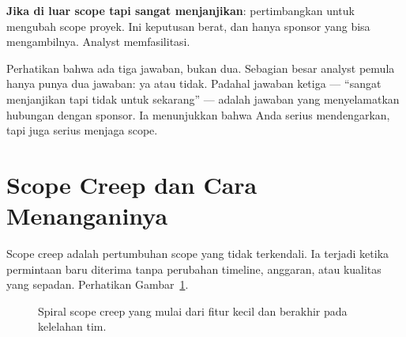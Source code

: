 \documentclass[11pt,a4paper]{article}
\begin{document}
\textbf{Jika di luar scope tapi sangat menjanjikan}: pertimbangkan untuk mengubah scope proyek. Ini keputusan berat, dan hanya sponsor yang bisa mengambilnya. Analyst memfasilitasi.

Perhatikan bahwa ada tiga jawaban, bukan dua. Sebagian besar analyst pemula hanya punya dua jawaban: ya atau tidak. Padahal jawaban ketiga — ``sangat menjanjikan tapi tidak untuk sekarang'' — adalah jawaban yang menyelamatkan hubungan dengan sponsor. Ia menunjukkan bahwa Anda serius mendengarkan, tapi juga serius menjaga scope.

\section{Scope Creep dan Cara Menanganinya}

Scope creep adalah pertumbuhan scope yang tidak terkendali. Ia terjadi ketika permintaan baru diterima tanpa perubahan timeline, anggaran, atau kualitas yang sepadan. Perhatikan Gambar~\ref{fig:creep}.

\begin{figure}[H]
	\centering
	\caption{Spiral scope creep yang mulai dari fitur kecil dan berakhir pada kelelahan tim.}
	\label{fig:creep}
\end{figure}
\end{document}
